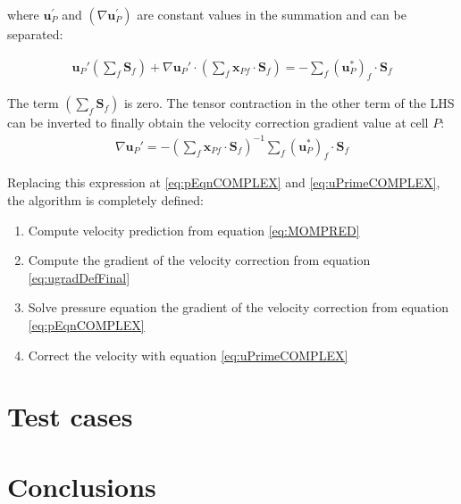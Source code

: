 \documentclass[final,3p,times,10pt,onecolumn]{myElsarticle}
\numberwithin{equation}{section}
\begin{document}
\noindent where $\boldsymbol{u}_P^{'}$ and $(\nabla \boldsymbol{u}_P^{'})$ are constant values in the summation and can be separated:

\begin{equation}\label{eq:ugradDef2}
\begin{split}
\boldsymbol{u}_P' \left(\sum_f \boldsymbol{S}_f\right) + \nabla \boldsymbol{u}_P' \cdot \left(\sum_f \boldsymbol{x}_{Pf} \cdot \boldsymbol{S}_f\right) = -\sum_f \left(\boldsymbol{u}_P^{*}\right)_f \cdot \boldsymbol{S}_f
\end{split}
\end{equation}

The term $\left(\sum_f \boldsymbol{S}_f\right)$ is zero. The tensor contraction in the other term of the LHS can be inverted to finally obtain the velocity correction gradient value at cell $P$:
\begin{equation}\label{eq:ugradDefFinal}
\begin{split}
\nabla \boldsymbol{u}_P' = -
\left(\sum_f \boldsymbol{x}_{Pf} \cdot \boldsymbol{S}_f\right)^{-1} \sum_f \left(\boldsymbol{u}_P^{*}\right)_f \cdot \boldsymbol{S}_f
\end{split}
\end{equation}

Replacing this expression at \ref{eq:pEqnCOMPLEX} and \ref{eq:uPrimeCOMPLEX}, the algorithm is completely defined:

\begin{enumerate}
\item Compute velocity prediction from equation \ref{eq:MOMPRED}
\item Compute the gradient of the velocity correction  from equation \ref{eq:ugradDefFinal}
\item Solve pressure equation  the gradient of the velocity correction from equation \ref{eq:pEqnCOMPLEX}
\item Correct the velocity with equation \ref{eq:uPrimeCOMPLEX}
\end{enumerate}

\section{Test cases}
\label{sec:cases}

\section{Conclusions}
\label{sec:conclusions}



\end{document}
